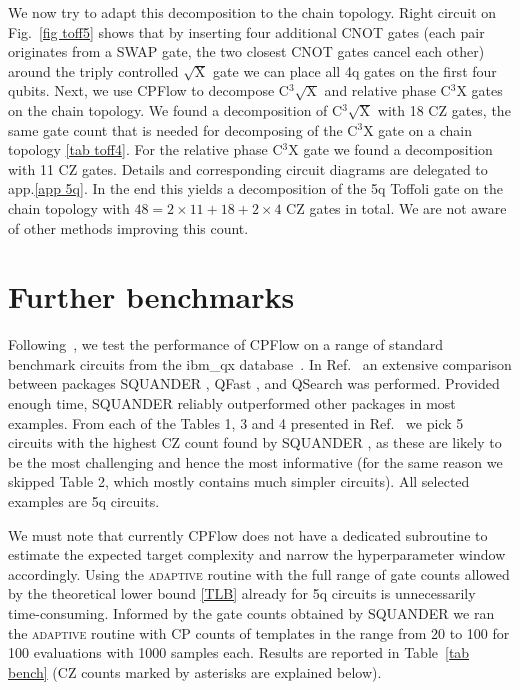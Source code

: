 \documentclass[draft, twocolumn, amsfonts, amssymb, aps, nofootinbib]{revtex4-2}
\newcommand{\CZ}{\textsf{CZ }}
\newcommand{\CX}{\textsf{CNOT }}
\newcommand{\CP}{\textsf{CP }}
\newcommand{\cx}[1]{C${}^{#1}$X}
\newcommand{\package}[1]{\textrm {#1 }}
\newcommand{\cpflow}{\package{CPFlow}}
\newcommand{\adaptive}{\textsc{adaptive }}
\begin{document}
We now try to adapt this decomposition to the chain topology. Right circuit on Fig.~\ref{fig toff5} shows that by inserting four additional \CX gates (each pair originates from a SWAP gate, the two closest \CX gates cancel each other) around the triply controlled $\sqrt{\text{X}}$ gate we can place all 4q gates on the first four qubits. Next, we use \cpflow to decompose C${}^{3}\sqrt{\text{X}}$ and relative phase \cx{3} gates on the chain topology. We found a decomposition of C${}^{3}\sqrt{\text{X}}$ with 18 \CZ gates, the same gate count that is needed for decomposing of the \cx{3} gate on a chain topology \ref{tab toff4}. For the relative phase \cx{3} gate we found a decomposition with 11 \CZ gates. Details and corresponding circuit diagrams are delegated to app.\ref{app 5q}. In the end this yields a decomposition of the 5q Toffoli gate on the chain topology with $48=2\times 11+18+2\times4$ \CZ gates in total. We are not aware of other methods improving this count.

\section{Further benchmarks \label{sec benchmark}}

Following~\cite{Rakyta2022}, we test the performance of \package{CPFlow} on a range of standard benchmark circuits from the ibm\_qx database~\cite{Zulehner2019, ibmqx}. In Ref.~\cite{Rakyta2022} an extensive comparison between packages \package{SQUANDER}, \package{QFast}, and \package{QSearch} was performed. Provided enough time, \package{SQUANDER} reliably outperformed other packages in most examples. From each of the Tables 1, 3 and 4 presented in Ref.~\cite{Rakyta2022} we pick 5 circuits with the highest \CZ count found by \package{SQUANDER}, as these are likely to be the most challenging and hence the most informative (for the same reason we skipped Table 2, which mostly contains much simpler circuits). All selected examples are 5q circuits.

We must note that currently \cpflow does not have a dedicated subroutine to estimate the expected target complexity and narrow the hyperparameter window accordingly. Using the \adaptive routine with the full range of gate counts allowed by the theoretical lower bound \eqref{TLB} already for 5q circuits is unnecessarily time-consuming. Informed by the gate counts obtained by \package{SQUANDER} we ran the \adaptive routine with \CP counts of templates in the range from 20 to 100 for 100 evaluations with 1000 samples each. Results are reported in Table~\ref{tab bench} (\CZ counts marked by asterisks are explained below).
\end{document}
